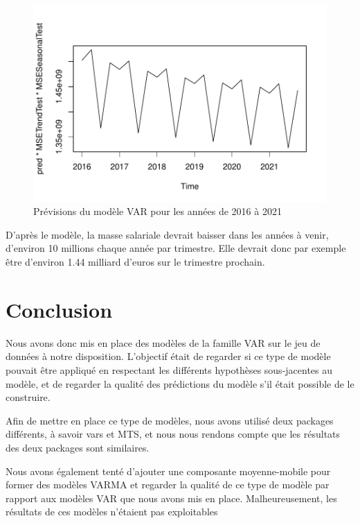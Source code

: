 \documentclass[11pt,]{article}
\begin{document}
\begin{figure}[htbp]
\centering
\includegraphics{doc_files/figure-latex/unnamed-chunk-50-1.pdf}
\caption{\label{fig30} Prévisions du modèle VAR pour les années de 2016
à 2021}
\end{figure}

D'après le modèle, la masse salariale devrait baisser dans les années à
venir, d'environ 10 millions chaque année par trimestre. Elle devrait
donc par exemple être d'environ 1.44 milliard d'euros sur le trimestre
prochain.

\newpage

\section*{Conclusion}\label{conclusion}

Nous avons donc mis en place des modèles de la famille VAR sur le jeu de
données à notre disposition. L'objectif était de regarder si ce type de
modèle pouvait être appliqué en respectant les différents hypothèses
sous-jacentes au modèle, et de regarder la qualité des prédictions du
modèle s'il était possible de le construire.

Afin de mettre en place ce type de modèles, nous avons utilisé deux
packages différents, à savoir vars et MTS, et nous nous rendons compte
que les résultats des deux packages sont similaires.

Nous avons également tenté d'ajouter une composante moyenne-mobile pour
former des modèles VARMA et regarder la qualité de ce type de modèle par
rapport aux modèles VAR que nous avons mis en place. Malheureusement,
les résultats de ces modèles n'étaient pas exploitables
\end{document}

